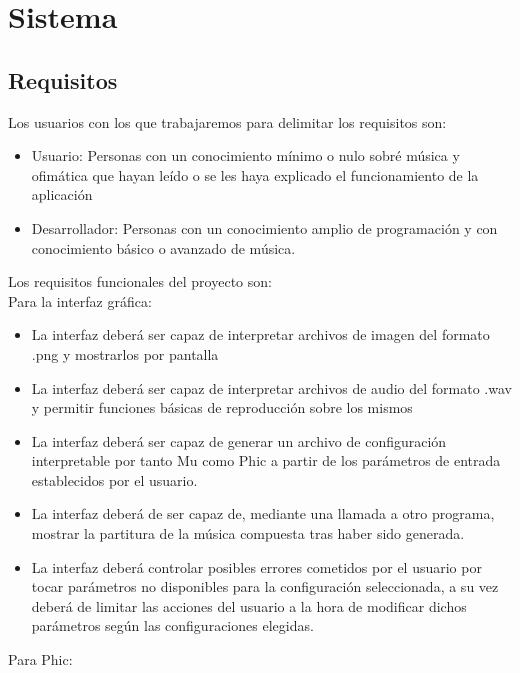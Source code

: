 \chapter{Sistema}

\section{Requisitos}
Los usuarios con los que trabajaremos para delimitar los requisitos son:
\begin{itemize}
	\item Usuario: Personas con un conocimiento mínimo o nulo sobré música y ofimática que hayan leído o se les haya explicado el funcionamiento de la aplicación
	\item Desarrollador: Personas con un conocimiento amplio de programación y con conocimiento básico o avanzado de música.
\end{itemize}
Los requisitos funcionales del proyecto son:
\\Para la interfaz gráfica:
 \begin{itemize}
	 \item La interfaz deberá ser capaz de interpretar archivos de imagen del formato .png y mostrarlos por pantalla
	 \item La interfaz deberá ser capaz de interpretar archivos de audio del formato .wav y permitir funciones básicas de reproducción sobre los mismos
	 \item La interfaz deberá ser capaz de generar un archivo de configuración interpretable por tanto Mu como Phic a partir de los parámetros de entrada establecidos por el usuario.
	 \item La interfaz deberá de ser capaz de, mediante una llamada a otro programa, mostrar la partitura de la música compuesta tras haber sido generada.
	 \item La interfaz deberá controlar posibles errores cometidos por el usuario por tocar parámetros no disponibles para la configuración seleccionada, a su vez deberá de limitar las acciones del usuario a la hora de modificar dichos parámetros según las configuraciones elegidas.
 \end{itemize}
 Para Phic:
